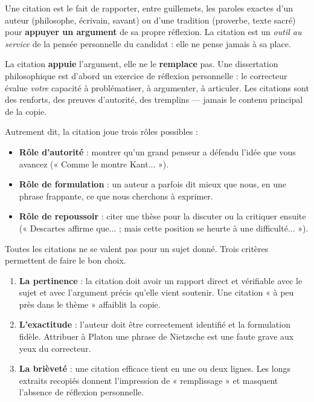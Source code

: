 \documentclass[11pt]{article}
\newcommand{\cle}[1]{{\popxbold\color{popdark}#1}}
\newcounter{popsec}
\newcounter{popsub}
\newcommand{\courssub}[1]{%
  \stepcounter{popsub}%
  \par\vspace{9pt}\noindent{\popxbold\fontsize{11.5}{13}\selectfont\color{popink}{\color{poporange}\thepopsec.\thepopsub}\hspace{6pt}#1}\par\nopagebreak\vspace{4pt}
}
\begin{document}
\begin{definition}
Une \cle{citation} est le fait de rapporter, entre guillemets, les paroles exactes d'un auteur (philosophe, écrivain, savant) ou d'une tradition (proverbe, texte sacré) pour \textbf{appuyer un argument} de sa propre réflexion. La citation est un \emph{outil au service} de la pensée personnelle du candidat : elle ne pense jamais à sa place.
\end{definition}

\begin{aretenir}[La règle d'or]
La citation \textbf{appuie} l'argument, elle ne le \textbf{remplace} pas. Une dissertation philosophique est d'abord un exercice de réflexion personnelle : le correcteur évalue \emph{votre} capacité à problématiser, à argumenter, à articuler. Les citations sont des renforts, des preuves d'autorité, des tremplins — jamais le contenu principal de la copie.
\end{aretenir}

Autrement dit, la citation joue trois rôles possibles :
\begin{itemize}
\item \textbf{Rôle d'autorité} : montrer qu'un grand penseur a défendu l'idée que vous avancez (« Comme le montre Kant... »).
\item \textbf{Rôle de formulation} : un auteur a parfois dit mieux que nous, en une phrase frappante, ce que nous cherchons à exprimer.
\item \textbf{Rôle de repoussoir} : citer une thèse pour la discuter ou la critiquer ensuite (« Descartes affirme que... ; mais cette position se heurte à une difficulté... »).
\end{itemize}

\courssub{Les règles de choix d'une citation}

Toutes les citations ne se valent pas pour un sujet donné. Trois critères permettent de faire le bon choix.

\begin{propriete}
\begin{enumerate}
\item \textbf{La pertinence} : la citation doit avoir un rapport direct et vérifiable avec le sujet et avec l'argument précis qu'elle vient soutenir. Une citation « à peu près dans le thème » affaiblit la copie.
\item \textbf{L'exactitude} : l'auteur doit être correctement identifié et la formulation fidèle. Attribuer à Platon une phrase de Nietzsche est une faute grave aux yeux du correcteur.
\item \textbf{La brièveté} : une citation efficace tient en une ou deux lignes. Les longs extraits recopiés donnent l'impression de « remplissage » et masquent l'absence de réflexion personnelle.
\end{enumerate}
\end{propriete}
\end{document}
